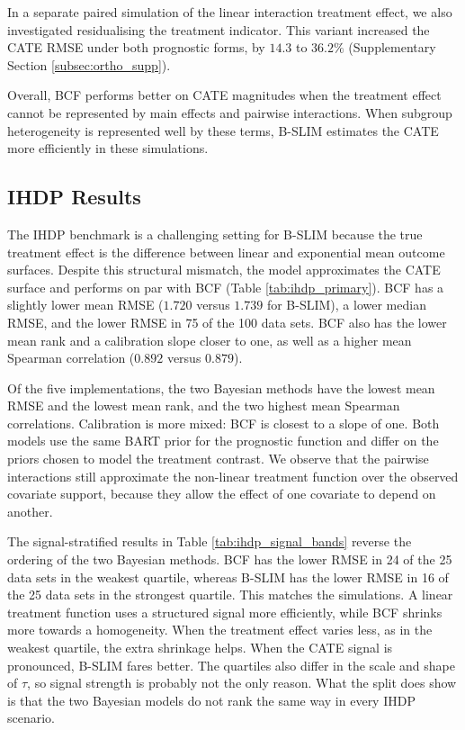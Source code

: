 \documentclass[12pt]{article}
\begin{document}
In a separate paired simulation of the linear interaction treatment effect, we also investigated residualising the treatment indicator. This variant increased the CATE RMSE under both prognostic forms, by $14.3$ to $36.2\%$ (Supplementary Section \ref{subsec:ortho_supp}).

Overall, BCF performs better on CATE magnitudes when the treatment effect cannot be represented by main effects and pairwise interactions. When subgroup heterogeneity is represented well by these terms, B-SLIM estimates the CATE more efficiently in these simulations.

\subsection{IHDP Results}
\label{subsec:ihdp}

The IHDP benchmark is a challenging setting for B-SLIM because the true treatment effect is the difference between linear and exponential mean outcome surfaces. Despite this structural mismatch, the model approximates the CATE surface and performs on par with BCF (Table \ref{tab:ihdp_primary}). BCF has a slightly lower mean RMSE ($1.720$ versus $1.739$ for B-SLIM), a lower median RMSE, and the lower RMSE in 75 of the 100 data sets. BCF also has the lower mean rank and a calibration slope closer to one, as well as a higher mean Spearman correlation ($0.892$ versus $0.879$).

Of the five implementations, the two Bayesian methods have the lowest mean RMSE and the lowest mean rank, and the two highest mean Spearman correlations. Calibration is more mixed: BCF is closest to a slope of one. Both models use the same BART prior for the prognostic function and differ on the priors chosen to model the treatment contrast. We observe that the pairwise interactions still approximate the non-linear treatment function over the observed covariate support, because they allow the effect of one covariate to depend on another.

The signal-stratified results in Table \ref{tab:ihdp_signal_bands} reverse the ordering of the two Bayesian methods. BCF has the lower RMSE in 24 of the 25 data sets in the weakest quartile, whereas B-SLIM has the lower RMSE in 16 of the 25 data sets in the strongest quartile. This matches the simulations. A linear treatment function uses a structured signal more efficiently, while BCF shrinks more towards a homogeneity. When the treatment effect varies less, as in the weakest quartile, the extra shrinkage helps. When the CATE signal is pronounced, B-SLIM fares better. The quartiles also differ in the scale and shape of $\tau$, so signal strength is probably not the only reason. What the split does show is that the two Bayesian models do not rank the same way in every IHDP scenario.
\end{document}
